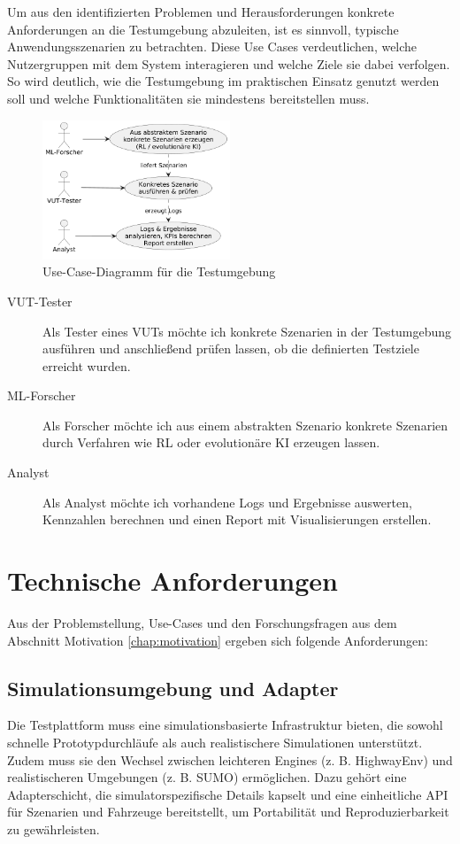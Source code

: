 Um aus den identifizierten Problemen und Herausforderungen konkrete Anforderungen an die Testumgebung abzuleiten, ist es sinnvoll, typische Anwendungsszenarien zu betrachten. Diese Use Cases verdeutlichen, welche Nutzergruppen mit dem System interagieren und welche Ziele sie dabei verfolgen. So wird deutlich, wie die Testumgebung im praktischen Einsatz genutzt werden soll und welche Funktionalitäten sie mindestens bereitstellen muss.

\begin{figure}[h]
    \centering
    \includegraphics[width=0.5\textwidth]{contents/figures/UseCaseDiagramm_InteProjekt.png}
    \caption{Use-Case-Diagramm für die Testumgebung}
    \label{fig:UseCaseDiagramm}
\end{figure}


\begin{description}
    \item[VUT-Tester] Als Tester eines VUTs möchte ich konkrete Szenarien in der Testumgebung ausführen und anschließend prüfen lassen, ob die definierten Testziele erreicht wurden.
    \item[ML-Forscher] Als Forscher möchte ich aus einem abstrakten Szenario konkrete Szenarien durch Verfahren wie RL oder evolutionäre KI erzeugen lassen.
    \item[Analyst] Als Analyst möchte ich vorhandene Logs und Ergebnisse auswerten, Kennzahlen berechnen und einen Report mit Visualisierungen erstellen.
\end{description}

\section{Technische Anforderungen}

Aus der Problemstellung, Use-Cases und den Forschungsfragen aus dem Abschnitt Motivation \ref{chap:motivation} ergeben sich folgende Anforderungen:

\subsection{Simulationsumgebung und Adapter}
Die Testplattform muss eine simulationsbasierte Infrastruktur bieten, die sowohl schnelle Prototypdurchläufe als auch realistischere Simulationen unterstützt. Zudem muss sie den Wechsel zwischen leichteren Engines (z. B. HighwayEnv) und realistischeren Umgebungen (z. B. SUMO) ermöglichen. Dazu gehört eine Adapterschicht, die simulatorspezifische Details kapselt und eine einheitliche API für Szenarien und Fahrzeuge bereitstellt, um Portabilität und Reproduzierbarkeit zu gewährleisten.

